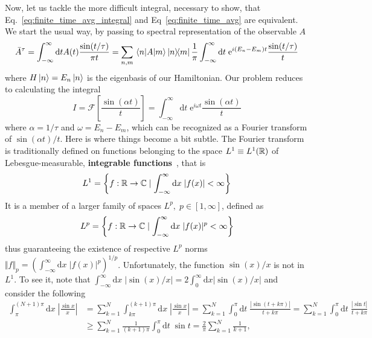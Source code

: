 Now, let us tackle the more difficult integral, necessary to show, that Eq.~\eqref{eq:finite_time_avg_integral}
and Eq~\eqref{eq:finite_time_avg} are equivalent. We start the usual way, by passing to spectral representation
of the observable \(A\)
\begin{equation}
    \bar{A}^{\tau} = \int_{-\infty}^{\infty} \mathrm{d}t A(t) \frac{\sin (t/\tau )}{\pi t}
    = \sum_{n,m}  \matrixel{n}{A}{m} \ketbra{n}{m} \frac{1}{\pi } \int_{-\infty}^{\infty} \mathrm{d}t\;
    \mathrm{e}^{i (E_n-E_m) t} \frac{\sin (t/\tau )}{t}
\end{equation}
where \(H\ket{n} = E_n \ket{n}\) is the eigenbasis of our Hamiltonian. Our problem reduces to calculating
the integral
\begin{equation}
    I =\mathcal{F}\left[ \frac{\sin (\alpha t)}{t} \right]=  \int_{-\infty}^{\infty} \mathrm{d}t\; \mathrm{e}^{i \omega  t} \frac{\sin (\alpha  t )}{t}
\end{equation}
where \(\alpha = 1/\tau\) and \(\omega = E_n-E_m\), which can be recognized as a Fourier transform of
\(\sin (\alpha  t )/t\). Here is where things become a bit subtle. The Fourier transform is traditionally
defined on functions belonging to the space \(L^1 \equiv L^1(\mathbb{R})\) of Lebesgue-measurable, \textbf{integrable
    functions}~\autocite{Rudin1987}, that is
\begin{equation}
    L^1 = \left\{f:\mathbb{R} \to \mathbb{C} \mid \int_{-\infty}^{\infty} \mathrm{d}x \; |f(x)| < \infty \right\}
\end{equation}
It is a member of a larger family of spaces \(L^p,\; p \in \left[ 1,\infty  \right] \), defined as
\begin{equation}
    L^p = \left\{f:\mathbb{R} \to \mathbb{C} \mid \int_{-\infty}^{\infty} \mathrm{d}x \; |f(x)|^p < \infty \right\}
\end{equation}
thus guaranteeing the existence of respective \(L^p\) norms \(\Vert f \Vert_p = \left(\int_{-\infty}^{\infty} \mathrm{d}x \; |f(x)|^p \right)^{1/p}\).
Unfortunately, the function \(\sin (x)/x\) is not in \(L^1\). To see it, note that
\(\int_{-\infty}^{\infty} \mathrm{d}x\; \vert \sin (x)/x \vert = 2 \int_{0}^{\infty} \mathrm{d}x \vert \sin (x)/x \vert  \)
and consider the following
\begin{align*}
    \int_{\pi}^{(N+1)\pi}\mathrm{d}x\;  \left|\frac{\sin x}x\right| & =\sum_{k=1}^N\int_{k\pi}^{(k+1)\pi}\mathrm{d}x \;\left|\frac{\sin x}x\right|
    =\sum_{k=1}^N\int_0^{\pi}\mathrm{d}t \;\frac{|\sin(t+k\pi)|}{t+k\pi}
    =\sum_{k=1}^N\int_0^{\pi}\mathrm{d}t \;\frac{|\sin t|}{t+k\pi}                                                                                 \\\
                                                                    & \geq \sum_{k=1}^N\frac 1{(k+1)\pi}\int_0^{\pi}\mathrm{d}t\;  \sin t
    =\frac 2{\pi}\sum_{k=1}^N\frac 1{k+1},
\end{align*}
